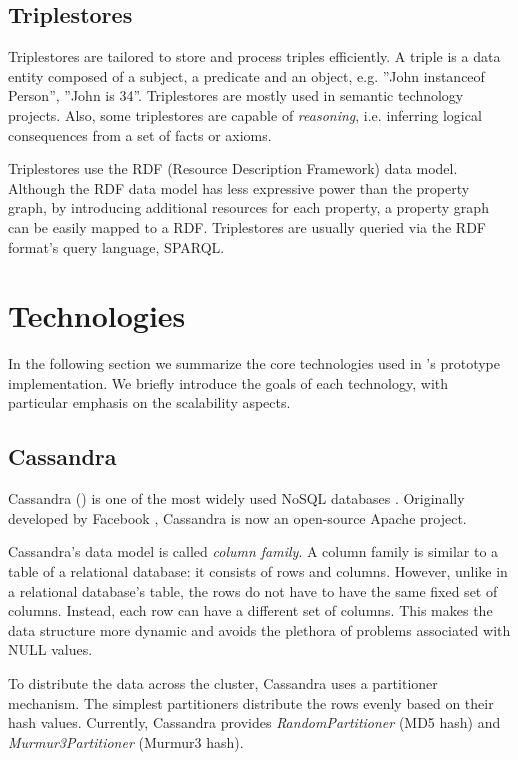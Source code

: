 \subsection{Triplestores}

Triplestores are tailored to store and process triples efficiently. A triple is a data entity composed of a subject, a predicate and an object, e.g. ''John instanceof Person'', ''John is 34''. Triplestores are mostly used in semantic technology projects. Also, some triplestores are capable of \emph{reasoning}, i.e. inferring logical consequences from a set of facts or axioms. 

Triplestores use the RDF (Resource Description Framework) data model. Although the RDF data model has less expressive power than the property graph, by introducing additional resources for each property, a property graph can be easily mapped to a RDF. Triplestores are usually queried via the RDF format's query language, SPARQL. 

\section{Technologies}

In the following section we summarize the core technologies used in \iqd's prototype implementation. We briefly introduce the goals of each technology, with particular emphasis on the scalability aspects.

\subsection{Cassandra}

Cassandra () is one of the most widely used NoSQL databases \cite{Cassandra}. Originally developed by Facebook \cite{Lakshman:2010:CDS:1773912.1773922}, Cassandra is now an open-source Apache project.

Cassandra's data model is called \emph{column family}. A column family is similar to a table of a relational database: it consists of rows and columns. However, unlike in a relational database's table, the rows do not have to have the same fixed set of columns. Instead, each row can have a different set of columns. This makes the data structure more dynamic and avoids the plethora of problems associated with NULL values.


To distribute the data across the cluster, Cassandra uses a partitioner mechanism. The simplest partitioners distribute the rows evenly based on their hash values. Currently, Cassandra provides \emph{RandomPartitioner} (MD5 hash) and \emph{Murmur3Partitioner} (Murmur3 hash).


